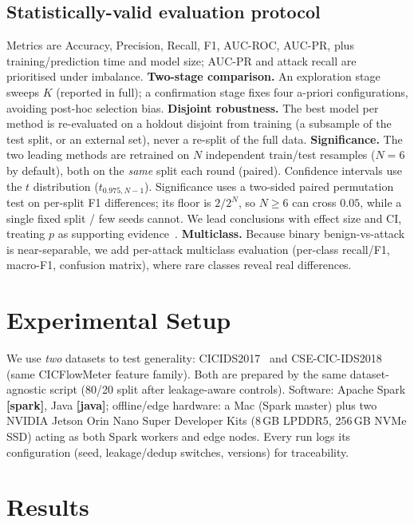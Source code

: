 \documentclass[runningheads]{llncs}
\newcommand{\ph}[1]{{\color{red}\textbf{[#1]}}}
\begin{document}
\subsection{Statistically-valid evaluation protocol}
\label{sec:protocol}
Metrics are Accuracy, Precision, Recall, F1, AUC-ROC, AUC-PR, plus training/prediction time and model size; AUC-PR and attack recall are prioritised under imbalance.
\textbf{Two-stage comparison.} An exploration stage sweeps $K$ (reported in full); a confirmation stage fixes four a-priori configurations, avoiding post-hoc selection bias.
\textbf{Disjoint robustness.} The best model per method is re-evaluated on a holdout disjoint from training (a subsample of the test split, or an external set), never a re-split of the full data.
\textbf{Significance.} The two leading methods are retrained on $N$ independent train/test resamples ($N{=}6$ by default), both on the \emph{same} split each round (paired). Confidence intervals use the $t$ distribution ($t_{0.975,N-1}$). Significance uses a two-sided paired permutation test on per-split F1 differences; its floor is $2/2^{N}$, so $N\ge 6$ can cross $0.05$, while a single fixed split / few seeds cannot. We lead conclusions with effect size and CI, treating $p$ as supporting evidence~\cite{demsar2006statistical,nadeau2003inference}.
\textbf{Multiclass.} Because binary benign-vs-attack is near-separable, we add per-attack multiclass evaluation (per-class recall/F1, macro-F1, confusion matrix), where rare classes reveal real differences.

\section{Experimental Setup}
\label{sec:setup}
We use \emph{two} datasets to test generality: CICIDS2017~\cite{sharafaldin2018toward} and CSE-CIC-IDS2018 (same CICFlowMeter feature family). Both are prepared by the same dataset-agnostic script (80/20 split after leakage-aware controls). Software: Apache Spark \ph{spark}, Java \ph{java}; offline/edge hardware: a Mac (Spark master) plus two NVIDIA Jetson Orin Nano Super Developer Kits (8\,GB LPDDR5, 256\,GB NVMe SSD) acting as both Spark workers and edge nodes. Every run logs its configuration (seed, leakage/dedup switches, versions) for traceability.

\section{Results}
\label{sec:results}
\end{document}
